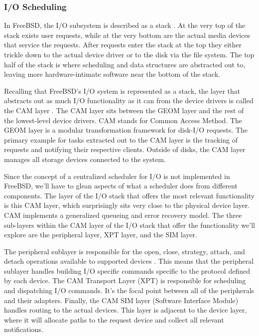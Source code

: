 \documentclass[10pt,draftclsnofoot,onecolumn]{IEEEtran}
\begin{document}
\subsubsection{I/O Scheduling}
\label{sub:IOScheduling FreeBSD}
In FreeBSD, the I/O subsystem is described as a stack \cite{bsd:2}.
At the very top of the stack exists user requests, while at the very bottom are the actual media devices that service the requests.
After requests enter the stack at the top they either trickle down to the actual device driver or to the disk via the file system.
The top half of the stack is where scheduling and data structures are abstracted out to, leaving more hardware-intimate software near the bottom of the stack.

\par Recalling that FreeBSD's I/O system is represented as a stack, the layer that abstracts out as much I/O functionality as it can from the device drivers is called the CAM layer \cite{bsd:1}.
The CAM layer sits between the GEOM layer and the rest of the lowest-level device drivers.
CAM stands for Common Access Method.
The GEOM layer is a modular transformation framework for disk-I/O requests.
The primary example for tasks extracted out to the CAM layer is the tracking of requests and notifying their respective clients.
Outside of disks, the CAM layer manages all storage devices connected to the system.

\par Since the concept of a centralized scheduler for I/O is not implemented in FreeBSD, we'll have to glean aspects of what a scheduler does from different components.
The layer of the I/O stack that offers the most relevant functionality is this CAM layer, which surprisingly sits very close to the physical device layer.
CAM implements a generalized queueing and error recovery model.
The three sub-layers within the CAM layer of the I/O stack that offer the functionality we'll explore are the peripheral layer, XPT layer, and the SIM layer.

\par The peripheral sublayer is responsible for the open, close, strategy, attach, and detach operations available to supported devices \cite{bsd:1}.
This means that the peripheral sublayer handles building I/O specific commands specific to the protocol defined by each device.
The CAM Transport Layer (XPT) is responsible for scheduling and dispatching I/O commands.
It's the focal point between all of the peripherals and their adapters.
Finally, the CAM SIM layer (Software Interface Module) handles routing to the actual devices.
This layer is adjacent to the device layer, where it will allocate paths to the request device and collect all relevant notifications.
\end{document}
